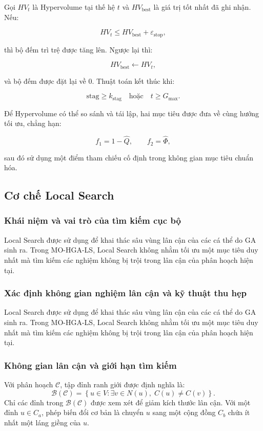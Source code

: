\documentclass[14pt,a4paper]{extarticle}
\begin{document}
Gọi $HV_t$ là Hypervolume tại thế hệ $t$ và $HV_{\mathrm{best}}$ là giá trị tốt nhất đã ghi nhận. Nếu:

\[
HV_t
\le
HV_{\mathrm{best}}+\varepsilon_{\mathrm{stop}},
\]

thì bộ đếm trì trệ được tăng lên. Ngược lại thì:

\[
HV_{\mathrm{best}}\leftarrow HV_t,
\]

và bộ đếm được đặt lại về $0$. Thuật toán kết thúc khi:

\[
\mathrm{stag}\ge k_{\mathrm{stag}}
\quad\text{hoặc}\quad
t\ge G_{\max}.
\]

Để Hypervolume có thể so sánh và tái lập, hai mục tiêu được đưa về cùng hướng tối ưu, chẳng hạn:

\[
f_1=1-\widehat Q,
\qquad
f_2=\widehat\Phi,
\]

sau đó sử dụng một điểm tham chiếu cố định trong không gian mục tiêu chuẩn hóa.

\subsection{Cơ chế Local Search}

\subsubsection{Khái niệm và vai trò của tìm kiếm cục bộ}

Local Search được sử dụng để khai thác sâu vùng lân cận của các cá thể do GA sinh ra. Trong MO-HGA-LS, Local Search không nhằm tối ưu một mục tiêu duy nhất mà tìm kiếm các nghiệm không bị trội trong lân cận của phân hoạch hiện tại.

\subsubsection{Xác định không gian nghiệm lân cận và kỹ thuật thu hẹp}

Local Search được sử dụng để khai thác sâu vùng lân cận của các cá thể do GA sinh ra. Trong MO-HGA-LS, Local Search không nhằm tối ưu một mục tiêu duy nhất mà tìm kiếm các nghiệm không bị trội trong lân cận của phân hoạch hiện tại.

\subsubsection{Không gian lân cận và giới hạn tìm kiếm}

Với phân hoạch $\mathcal{C}$, tập đỉnh ranh giới được định nghĩa là:
\[
\mathcal{B}(\mathcal{C})
=
\left\{
u\in V:
\exists v\in N(u),\;C(u)\neq C(v)
\right\}.
\]
Chỉ các đỉnh trong $\mathcal{B}(\mathcal{C})$ được xem xét để giảm kích thước lân cận. Với một đỉnh $u\in C_a$, phép biến đổi cơ bản là chuyển $u$ sang một cộng đồng $C_b$ chứa ít nhất một láng giềng của $u$.
\end{document}
